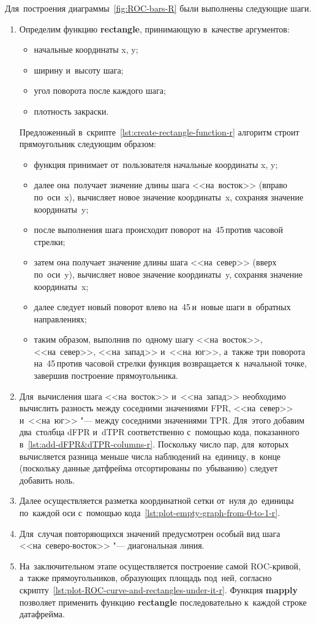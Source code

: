 \documentclass[]{scrreprt}
\begin{document}
Для~построения диаграммы~\ref{fig:ROC-bars-R} были выполнены следующие шаги.
\begin{enumerate}
	\item Определим функцию \textbf{rectangle}, принимающую в~качестве аргументов:
	\begin{itemize}
		\item начальные координаты x, y;
		\item ширину и~высоту шага;
		\item угол поворота после каждого шага;
		\item плотность закраски.
	\end{itemize}
	Предложенный в~скрипте~\ref{lst:create-rectangle-function-r} алгоритм строит прямоугольник следующим образом:
	\begin{itemize}
		\item функция принимает от~пользователя начальные координаты x, y;
		\item далее она~получает значение длины шага <<на~восток>> (вправо по~оси~x), вычисляет новое значение координаты~x, сохраняя значение координаты~y;
		\item после выполнения шага происходит поворот на~45\,\textdegree против часовой стрелки;
		\item затем она получает значение длины шага <<на~север>> (вверх по~оси~y), вычисляет новое значение координаты~y, сохраняя значение координаты~x;
		\item далее следует новый поворот влево на~45\,\textdegree и~новые шаги в~обратных направлениях;
		\item таким образом, выполнив по~одному шагу <<на~восток>>, <<на~север>>, <<на~запад>> и~<<на~юг>>, а~также три поворота на~45\,\textdegree против часовой стрелки функция возвращается к~начальной точке, завершив построение прямоугольника.
	\end{itemize}
	\item Для~вычисления шага <<на~восток>> и~<<на~запад>> необходимо вычислить разность между соседними значениями FPR, <<на~север>> и~<<на~юг>> "--- между соседними значениями TPR. Для~этого добавим два~столбца dFPR и~dTPR соответственно с~помощью кода, показанного в~\ref{lst:add-dFPR&dTPR-columns-r}. Поскольку число пар, для~которых вычисляется разница меньше числа наблюдений на~единицу, в~конце (поскольку данные датфрейма отсортированы по~убыванию) следует добавить ноль.
	\item Далее осуществляется разметка координатной сетки от~нуля до~единицы по~каждой оси с~помощью кода~\ref{lst:plot-empty-graph-from-0-to-1-r}.
	\item Для~случая повторяющихся значений предусмотрен особый вид шага <<на~северо-восток>> "--- диагональная линия.
	\item На~заключительном этапе осуществляется построение самой ROC-кривой, а~также прямоугольников, образующих площадь под~ней, согласно скрипту~\ref{lst:plot-ROC-curve-and-rectangles-under-it-r}. Функция \textbf{mapply} позволяет применить функцию \textbf{rectangle} последовательно к~каждой строке датафрейма.
\end{enumerate}
\end{document}
